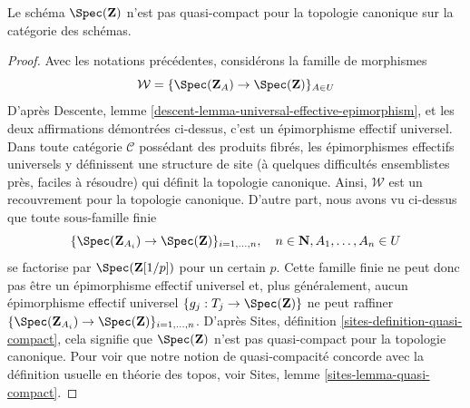 \begin{lemma}
\label{lemma-Z-not-quasi-compact}
Le schéma $\Spec(\mathbf{Z})$ n'est pas quasi-compact pour
la topologie canonique sur la catégorie des schémas.
\end{lemma}

\begin{proof}
Avec les notations précédentes, considérons la famille de morphismes
$$
\mathcal{W} = \{\Spec(\mathbf{Z}_A) \to \Spec(\mathbf{Z})\}_{A \in U}
$$
D'après Descente, lemme \ref{descent-lemma-universal-effective-epimorphism}, et les deux
affirmations démontrées ci-dessus, c'est un épimorphisme effectif
universel. Dans toute catégorie $\mathcal{C}$ possédant des produits fibrés, les
épimorphismes effectifs universels y définissent une
structure de site (à quelques difficultés ensemblistes près, faciles
à résoudre) qui définit la topologie canonique.
Ainsi, $\mathcal{W}$ est un recouvrement pour la topologie canonique.
D'autre part, nous avons vu ci-dessus que toute sous-famille finie
$$
\{\Spec(\mathbf{Z}_{A_i}) \to \Spec(\mathbf{Z})\}_{i = 1, \ldots, n},\quad
n \in \mathbf{N}, A_1, \ldots, A_n \in U
$$
se factorise par $\Spec(\mathbf{Z}[1/p])$ pour un certain $p$.
Cette famille finie ne peut donc pas être un épimorphisme effectif
universel et, plus généralement, aucun épimorphisme effectif universel
$\{g_j : T_j \to \Spec(\mathbf{Z})\}$ ne peut raffiner
$\{\Spec(\mathbf{Z}_{A_i}) \to \Spec(\mathbf{Z})\}_{i = 1, \ldots, n}$.
D'après Sites, définition \ref{sites-definition-quasi-compact},
cela signifie que $\Spec(\mathbf{Z})$ n'est pas quasi-compact
pour la topologie canonique. Pour voir que notre notion de
quasi-compacité concorde avec la définition usuelle
en théorie des topos, voir Sites, lemme \ref{sites-lemma-quasi-compact}.
\end{proof}













